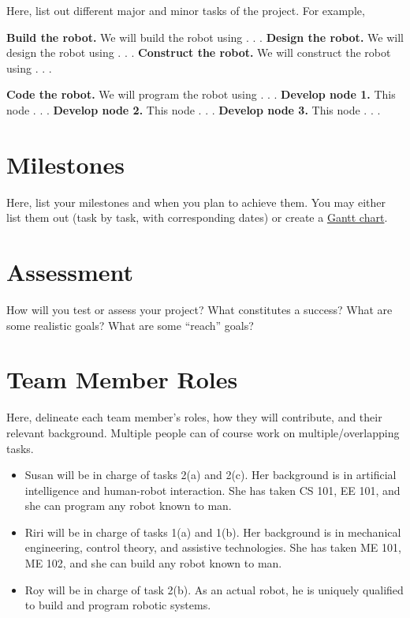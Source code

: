\documentclass[letterpaper]{article}
\begin{document}
Here, list out different major and minor tasks of the project. For example, 

\begin{outline}[enumerate]

\1 \textbf{Build the robot.} We will build the robot using . . .
\2 \textbf{Design the robot.} We will design the robot using . . .
\2 \textbf{Construct the robot.} We will construct the robot using . . .

\1 \textbf{Code the robot.} We will program the robot using . . .
\2 \textbf{Develop node 1.} This node . . .
\2 \textbf{Develop node 2.} This node . . .
\2 \textbf{Develop node 3.} This node . . . 

\end{outline}

\section{Milestones}

Here, list your milestones and when you plan to achieve them. You may either list them out (task by task, with corresponding dates) or create a \href{https://en.wikipedia.org/wiki/Gantt_chart}{Gantt chart}.

\section{Assessment}

How will you test or assess your project? What constitutes a success? What are some realistic goals? What are some ``reach'' goals?

\section{Team Member Roles}

Here, delineate each team member's roles, how they will contribute, and their relevant background. Multiple people can of course work on multiple/overlapping tasks.

\begin{itemize}
\item Susan will be in charge of tasks 2(a) and 2(c). Her background is in artificial intelligence and human-robot interaction. She has taken CS 101, EE 101, and she can program any robot known to man.
\item Riri will be in charge of tasks 1(a) and 1(b). Her background is in mechanical engineering, control theory, and assistive technologies. She has taken ME 101, ME 102, and she can build any robot known to man.
\item Roy will be in charge of task 2(b). As an actual robot, he is uniquely qualified to build and program robotic systems.
\end{itemize}
\end{document}
